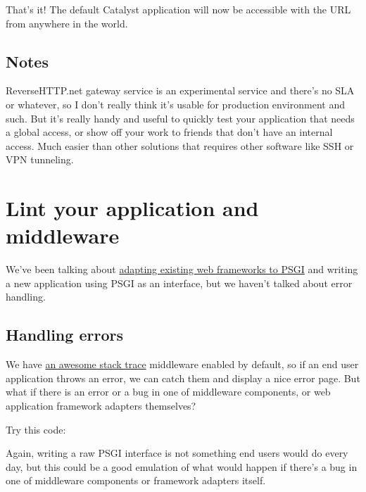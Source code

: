 That's it! The default Catalyst application will now be accessible with
the URL  from anywhere in the world.

\section{Notes}\label{notes}

ReverseHTTP.net gateway service is an experimental service and there's
no SLA or whatever, so I don't really think it's usable for production
environment and such. But it's really handy and useful to quickly test
your application that needs a global access, or show off your work to
friends that don't have an internal access. Much easier than other
solutions that requires other software like SSH or VPN tunneling.

\chapter{Lint your application and
middleware}\label{day-21-lint-your-application-and-middleware}

We've been talking about
\href{http://advent.plackperl.org/2009/12/day-8-adapting-web-frameworks-to-psgi.html}{adapting
existing web frameworks to PSGI} and writing a new application using
PSGI as an interface, but we haven't talked about error handling.

\section{Handling errors}\label{handling-errors}

We have
\href{http://advent.plackperl.org/2009/12/day-3-using-plackup.html}{an
awesome stack trace} middleware enabled by default, so if an end user
application throws an error, we can catch them and display a nice error
page. But what if there is an error or a bug in one of middleware
components, or web application framework adapters themselves?

Try this code:


Again, writing a raw PSGI interface is not something end users would do
every day, but this could be a good emulation of what would happen if
there's a bug in one of middleware components or framework adapters
itself.

